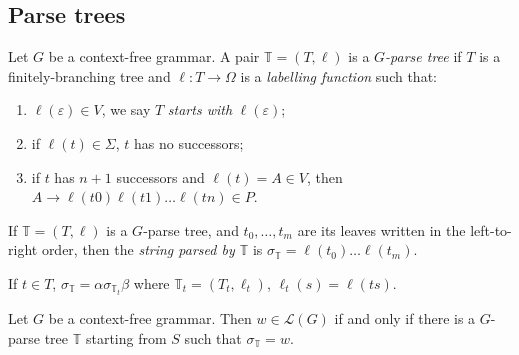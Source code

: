 \subsection{Parse trees}
\begin{definition}
	Let \( G \) be a context-free grammar.
	A pair \( \mathbb T = (T, \ell) \) is a \emph{\( G \)-parse tree} if \( T \) is a finitely-branching tree and \( \ell \colon T \to \Omega \) is a \emph{labelling function} such that:
	\begin{enumerate}
		\item \( \ell(\varepsilon) \in V \), we say \( T \) \emph{starts with} \( \ell(\varepsilon) \);
		\item if \( \ell(t) \in \Sigma \), \( t \) has no successors;
		\item if \( t \) has \( n + 1 \) successors and \( \ell(t) = A \in V \), then \( A \to \ell(t0) \ell(t1) \dots \ell(tn) \in P \).
	\end{enumerate}
	If \( \mathbb T = (T,\ell) \) is a \( G \)-parse tree, and \( t_0, \dots, t_m \) are its leaves written in the left-to-right order, then the \emph{string parsed by \( \mathbb T \)} is \( \sigma_{\mathbb T} = \ell(t_0) \dots \ell(t_m) \).
\end{definition}
\begin{remark}
	If \( t \in T \), \( \sigma_{\mathbb T} = \alpha \sigma_{\mathbb T_t} \beta \) where \( \mathbb T_t = (T_t, \ell_t) \), \( \ell_t(s) = \ell(ts) \).
\end{remark}
\begin{proposition}
	Let \( G \) be a context-free grammar.
	Then \( w \in \mathcal L(G) \) if and only if there is a \( G \)-parse tree \( \mathbb T \) starting from \( S \) such that \( \sigma_{\mathbb T} = w \).
\end{proposition}
